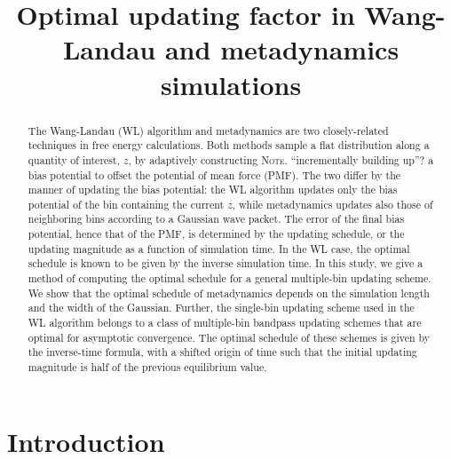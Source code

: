 \documentclass[reprint, floatfix]{revtex4-1}
\newcommand{\note}[1]{{\color{DarkGreen}\footnotesize \textsc{Note.} #1}}
\begin{document}
\title{Optimal updating factor in Wang-Landau and metadynamics simulations}



\begin{abstract}
  The Wang-Landau (WL) algorithm and metadynamics
  are two closely-related techniques
  in free energy calculations.
  Both methods sample a flat distribution
  along a quantity of interest, $z$,
  by adaptively constructing
  \note{``incrementally building up''?}
  a bias potential to offset
  the potential of mean force (PMF).
  The two differ by
  the manner of updating the bias potential:
  the WL algorithm updates only
  the bias potential of
  the bin containing the current $z$,
  while metadynamics updates also
  those of neighboring bins according to
  a Gaussian wave packet.
  The error of the final bias potential,
  hence that of the PMF,
  is determined by the updating schedule,
  or the updating magnitude
  as a function of simulation time.
  In the WL case,
  the optimal schedule
  is known to be given by
  the inverse simulation time.
  In this study,
  we give a method of computing the optimal schedule
  for a general multiple-bin updating scheme.
  We show that the optimal schedule of metadynamics
  depends on the simulation length
  and the width of the Gaussian.
  Further,
  the single-bin updating scheme
  used in the WL algorithm
  belongs to a class of multiple-bin bandpass updating schemes
  that are optimal for asymptotic convergence.
  The optimal schedule of these schemes
  is given by the inverse-time formula,
  with a shifted origin of time such that
  the initial updating magnitude is half of
  the previous equilibrium value.
\end{abstract}

\maketitle



\section{Introduction}
\end{document}
